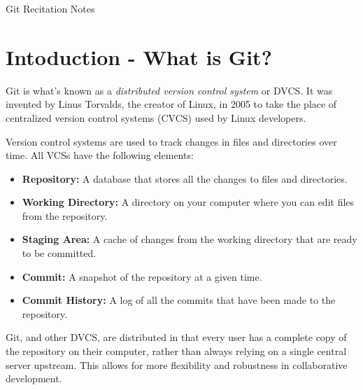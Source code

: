 \documentclass[fleqn]{article}
\begin{document}
\begin{center}\LARGE Git Recitation Notes \end{center}

\section*{Intoduction - What is Git?}
Git is what's known as a \textit{distributed version control system} or DVCS.
It was invented by Linus Torvalds, the creator of Linux, in 2005 to take the
place of centralized version control systems (CVCS) used by Linux developers.

Version control systems are used to track changes in files and directories over
time. All VCSs have the following elements:

\begin{itemize}
    \item \textbf{Repository:} A database that stores all the changes to files
                               and directories.
    \item \textbf{Working Directory:} A directory on your computer where you can
                                      edit files from the repository.
    \item \textbf{Staging Area:} A cache of changes from the working directory
                                that are ready to be committed.
    \item \textbf{Commit:} A snapshot of the repository at a given time.
    \item \textbf{Commit History:} A log of all the commits that have been
                                   made to the repository.
\end{itemize}

Git, and other DVCS, are distributed in that every user has a complete copy of
the repository on their computer, rather than always relying on a single
central server upstream. This allows for more flexibility and robustness in
collaborative development.
\end{document}
